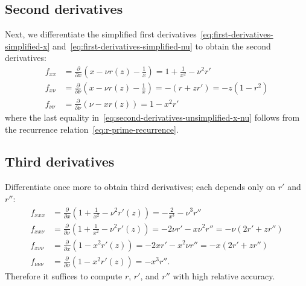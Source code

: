 \documentclass{article}
\begin{document}
\subsection{Second derivatives}

Next, we differentiate the simplified first derivatives~\eqref{eq:first-derivatives-simplified-x} and~\eqref{eq:first-derivatives-simplified-nu} to obtain the second derivatives:
%
\begin{align}
  f_{xx}     & = \frac{\partial}{\partial x}\left(x - \nu r(z) - \frac{1}{x}\right) = 1 + \frac{1}{x^2} - \nu^2 r' \label{eq:second-derivatives-unsimplified-x-x} \\
  f_{x\nu}   & = \frac{\partial}{\partial \nu}\left(x - \nu r(z) - \frac{1}{x}\right) = -(r + z r') = -z(1 - r^2) \label{eq:second-derivatives-unsimplified-x-nu} \\
  f_{\nu\nu} & = \frac{\partial}{\partial \nu}\left(\nu - x r(z)\right) = 1 - x^2 r' \label{eq:second-derivatives-unsimplified-nu-nu}
\end{align}
%
where the last equality in~\eqref{eq:second-derivatives-unsimplified-x-nu} follows from the recurrence relation~\eqref{eq:r-prime-recurrence}.

\subsection{Third derivatives}

Differentiate once more to obtain third derivatives; each depends only on $r'$ and $r''$:
%
\begin{align}
  f_{xxx}       & = \frac{\partial}{\partial x}\left(1+\frac{1}{x^2}-\nu^2 r'(z)\right) = -\frac{2}{x^3} - \nu^3 r'' \label{eq:third-derivatives-unsimplified-x-x-x}                                 \\
  f_{xx\nu}     & = \frac{\partial}{\partial \nu}\left(1+\frac{1}{x^2}-\nu^2 r'(z)\right) = -2\nu r' - x\nu^2 r'' = -\nu(2r' + z r'')              \label{eq:third-derivatives-unsimplified-x-x-nu}  \\
  f_{x\nu\nu}   & = \frac{\partial}{\partial x}\left(1 - x^2 r'(z)\right) = -2x r' - x^2\nu r'' = -x(2r' + z r'')                                  \label{eq:third-derivatives-unsimplified-x-nu-nu} \\
  f_{\nu\nu\nu} & = \frac{\partial}{\partial \nu}\left(1 - x^2 r'(z)\right) = -x^3 r''. \label{eq:third-derivatives-unsimplified-nu-nu-nu}
\end{align}
%
Therefore it suffices to compute $r$, $r'$, and $r''$ with high relative accuracy.
\end{document}
